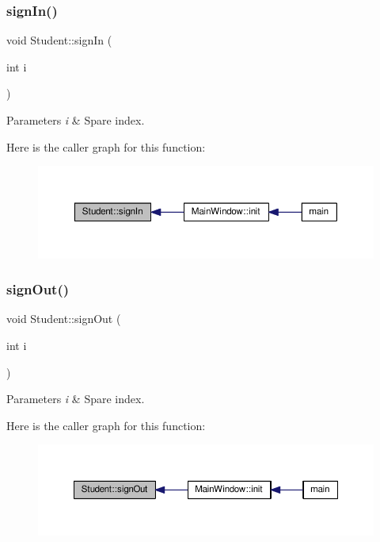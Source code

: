\subsubsection{\texorpdfstring{sign\+In()}{signIn()}}
{\footnotesize\ttfamily void Student\+::sign\+In (\begin{DoxyParamCaption}\item[{int}]{i }\end{DoxyParamCaption})}


\begin{DoxyParams}{Parameters}
{\em i} & Spare index. \\
\hline
\end{DoxyParams}
Here is the caller graph for this function\+:
\nopagebreak
\begin{figure}[H]
\begin{center}
\leavevmode
\includegraphics[width=350pt]{class_student_a51f1de2461562ab241af8392a536d224_icgraph}
\end{center}
\end{figure}
\mbox{\label{class_student_a8124778da762c247391697e871b31983}} 
\subsubsection{\texorpdfstring{sign\+Out()}{signOut()}}
{\footnotesize\ttfamily void Student\+::sign\+Out (\begin{DoxyParamCaption}\item[{int}]{i }\end{DoxyParamCaption})}


\begin{DoxyParams}{Parameters}
{\em i} & Spare index. \\
\hline
\end{DoxyParams}
Here is the caller graph for this function\+:
\nopagebreak
\begin{figure}[H]
\begin{center}
\leavevmode
\includegraphics[width=350pt]{class_student_a8124778da762c247391697e871b31983_icgraph}
\end{center}
\end{figure}


